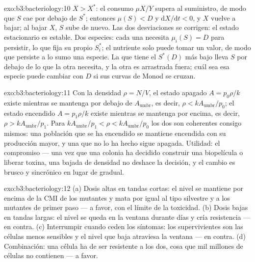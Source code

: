 \begin{solution}{exo:b3:bacteriology:10}
$X > X^{*}$: el consumo $\mu X/Y$ supera al suministro, de modo que $S$
cae por debajo de $S^{*}$; entonces $\mu(S) < D$ y
$\mathrm{d}X/\mathrm{d}t < 0$, y $X$ vuelve a bajar; al bajar $X$, $S$
sube de nuevo. Las dos desviaciones se corrigen: el estado estacionario
es estable. Dos especies: cada una necesita $\mu_{i}(S) = D$ para
persistir, lo que fija su propio $S_{i}^{*}$; el nutriente solo puede
tomar un valor, de modo que persiste a lo sumo una especie. La que tiene
el $S^{*}(D)$ más bajo lleva $S$ por debajo de lo que la otra necesita, y
la otra es arrastrada fuera; cuál sea esa especie puede cambiar con $D$
si sus curvas de Monod se cruzan.
\end{solution}

\begin{solution}{exo:b3:bacteriology:11}
Con la densidad $\rho = N/V$, el estado apagado $A = p_{0}\rho/k$ existe
mientras se mantenga por debajo de $A_{\text{umbr}}$, es decir,
$\rho < kA_{\text{umbr}}/p_{0}$; el estado encendido $A = p_{1}\rho/k$
existe mientras se mantenga por encima, es decir, $\rho
> kA_{\text{umbr}}/p_{1}$. Para $kA_{\text{umbr}}/p_{1} < \rho <
kA_{\text{umbr}}/p_{0}$ los dos son coherentes consigo mismos: una
población que se ha encendido se mantiene encendida con su producción
mayor, y una que no lo ha hecho sigue apagada. Utilidad: el compromiso
--- una vez que una colonia ha decidido construir una biopelícula o
liberar toxina, una bajada de densidad no deshace la decisión, y el
cambio es brusco y sincrónico en lugar de gradual.
\end{solution}

\begin{solution}{exo:b3:bacteriology:12}
(a) Dosis altas en tandas cortas: el nivel se mantiene por encima de la
CMI de los mutantes y mata por igual al tipo silvestre y a los mutantes
de primer paso --- a favor, con el límite de la toxicidad. (b) Dosis
bajas en tandas largas: el nivel se queda en la ventana durante días y
cría resistencia --- en contra. (c) Interrumpir cuando ceden los
síntomas: los supervivientes son las células menos sensibles y el nivel
que baja atraviesa la ventana --- en contra. (d) Combinación: una célula
ha de ser resistente a los dos, cosa que mil millones de células no
contienen --- a favor.
\end{solution}

